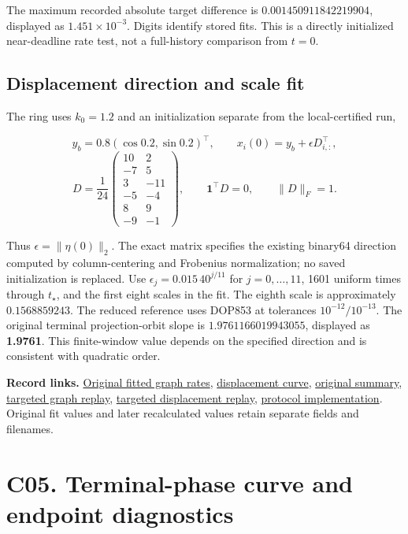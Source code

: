 \documentclass[11pt,a4paper]{article}
\begin{document}
The maximum recorded absolute target difference is
\(0.001450911842219904\), displayed as \(1.451\times10^{-3}\). Digits
identify stored fits. This is a directly initialized near-deadline rate
test, not a full-history comparison from \(t=0\).

\subsection{Displacement direction and scale
fit}\label{c04-displacement}

The ring uses \(k_0=1.2\) and an initialization separate from the
local-certified run,

\[
y_b=0.8(\cos0.2,\sin0.2)^\top,\qquad x_i(0)=y_b+\epsilon D_{i,:}^\top,
\] \[
D=\frac1{24}\begin{pmatrix}10&2\\-7&5\\3&-11\\-5&-4\\8&9\\-9&-1\end{pmatrix},
\qquad \mathbf1^\top D=0,\qquad\|D\|_F=1. \tag{E05}
\]

Thus \(\epsilon=\|\eta(0)\|_2\). The exact matrix specifies the existing
binary64 direction computed by column-centering and Frobenius
normalization; no saved initialization is replaced. Use
\(\epsilon_j=0.015\,40^{j/11}\) for \(j=0,\ldots,11\), 1601 uniform
times through \(t_\star\), and the first eight scales in the fit. The
eighth scale is approximately \(0.1568859243\). The reduced reference
uses DOP853 at tolerances \(10^{-12}/10^{-13}\). The original terminal
projection-orbit slope is \(1.9761166019943055\), displayed as
\textbf{1.9761}. This finite-window value depends on the specified
direction and is consistent with quadratic order.

\textbf{Record links.}
\href{../data/records/exponent_validation.csv}{Original fitted graph
rates}, \href{../data/records/tangential_scaling.csv}{displacement
curve}, \href{../data/records/numerical_summary.json}{original summary},
\href{../data/targeted_reference/protocols/graph_protocol_and_reintegration.csv}{targeted
graph replay},
\href{../data/targeted_reference/protocols/displacement_protocol_and_reintegration.csv}{targeted
displacement replay}, \href{../targeted/protocol_reference.py}{protocol
implementation}. Original fit values and later recalculated values
retain separate fields and filenames.

\section{C05. Terminal-phase curve and endpoint diagnostics}\label{c05}
\end{document}
